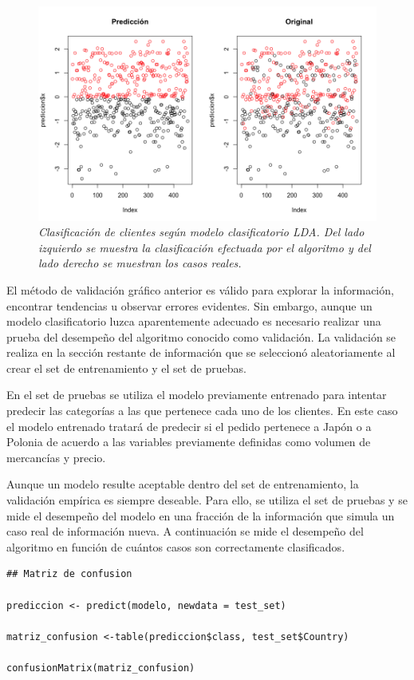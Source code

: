 \documentclass[letterpaper,12pt, spanish, oneside]{book} %
\begin{document}
\begin{figure}[H]
\centering
\includegraphics[width=1\textwidth]{marketing3.png}
\caption{\label{fig:frog2}\textit{Clasificación de clientes según modelo clasificatorio LDA. Del lado izquierdo se muestra la clasificación efectuada por el algoritmo y del lado derecho se muestran los casos reales.}}
\end{figure}

El método de validación gráfico anterior es válido para explorar la información, encontrar tendencias u observar errores evidentes. Sin embargo, aunque un modelo clasificatorio luzca aparentemente adecuado es necesario realizar una prueba del desempeño del algoritmo conocido como validación. La validación se realiza en la sección restante de información que se seleccionó aleatoriamente al crear el set de entrenamiento y el set de pruebas. 

En el set de pruebas se utiliza el modelo previamente entrenado para intentar predecir las categorías a las que pertenece cada uno de los clientes. En este caso el modelo entrenado tratará de predecir si el pedido pertenece a Japón o a Polonia de acuerdo a las variables previamente definidas como volumen de mercancías y precio. 

Aunque un modelo resulte aceptable dentro del set de entrenamiento, la validación empírica es siempre deseable. Para ello, se utiliza el set de pruebas y se mide el desempeño del modelo en una fracción de la información que simula un caso real de información nueva. A continuación se mide el desempeño del algoritmo en función de cuántos casos son correctamente clasificados.

\begin{lstlisting}
## Matriz de confusion

prediccion <- predict(modelo, newdata = test_set)

matriz_confusion <-table(prediccion$class, test_set$Country)

confusionMatrix(matriz_confusion)
\end{lstlisting}
\end{document}
